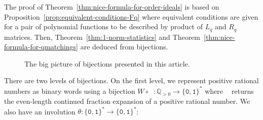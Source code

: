 \documentclass[a4paper,12pt]{amsart}
\newcommand{\Z}{\mathbb{Z}}
\newcommand{\Q}{\mathbb{Q}}
\newcommand{\xx}{{x}}
\newcommand{\Acal}{{\mathcal{A}}}
\newcommand{\Bcal}{{\mathcal{B}}}
\newcommand{\Fcal}{{\mathcal{F}}}
\newcommand{\Gcal}{{\mathcal{G}}}
\newcommand{\Jcal}{{\mathcal{J}}}
\newcommand{\Mcal}{{\mathcal{M}}}
\newcommand{\Zcal}{{\mathcal{Z}}}
\newcommand{\0}{\mathtt{0}}
\newcommand{\1}{\mathtt{1}}
\newcommand{\2}{\mathtt{2}}
\newcommand{\3}{\mathtt{3}}
\newcommand{\Acaleven}{{\Acal_{\text{even}}}}
\DeclareMathOperator{\CFeven}{{CF_{\text{even}}}}
\DeclareMathOperator{\val}{val}
\begin{document}
The proof of Theorem~\ref{thm:nice-formula-for-order-ideals} is
based on Proposition~\ref{prop:equivalent-conditions-Fq}
where equivalent conditions are given for a pair of polynomial functions
to be described by product of $L_q$ and $R_q$ matrices.
Then, Theorem~\ref{thm:1-norm-statistics}
and Theorem~\ref{thm:nice-formula-for-qmatchings} are deduced
from bijections.

\begin{figure}[h]
\begin{center}
\end{center}
    \caption{The big picture of bijections presented in this article.}
    \label{fig:the-big-picture}
\end{figure}


There are two levels of bijections.
On the first level, we represent positive
rational numbers as binary words
using a bijection $W\circ\CFeven:\Q_{>0}\to\{\0,\1\}^*$
where $\CFeven$ returns the even-length continued fraction expansion
of a positive rational number.
We also have an involution $\theta:\{\0,\1\}^*\to\{\0,\1\}^*$:
\begin{center}
\end{center}
\end{document}
